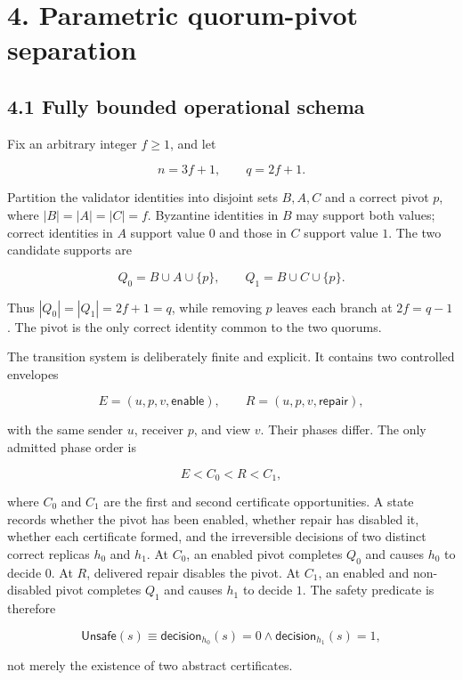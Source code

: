 \documentclass[10pt,a4paper]{article}
\begin{document}
\section{4. Parametric quorum-pivot
separation}\label{parametric-quorum-pivot-separation}

\subsection{4.1 Fully bounded operational
schema}\label{fully-bounded-operational-schema}

Fix an arbitrary integer \(f\geq1\), and let

\[
n=3f+1,\qquad q=2f+1.
\]

Partition the validator identities into disjoint sets \(B,A,C\) and a
correct pivot \(p\), where \(|B|=|A|=|C|=f\). Byzantine identities in
\(B\) may support both values; correct identities in \(A\) support value
\(0\) and those in \(C\) support value \(1\). The two candidate supports
are

\[
Q_0=B\cup A\cup\{p\},\qquad Q_1=B\cup C\cup\{p\}.
\]

Thus \(|Q_0|=|Q_1|=2f+1=q\), while removing \(p\) leaves each branch at
\(2f=q-1\). The pivot is the only correct identity common to the two
quorums.

The transition system is deliberately finite and explicit. It contains
two controlled envelopes

\[
E=(u,p,v,\mathsf{enable}),\qquad R=(u,p,v,\mathsf{repair}),
\]

with the same sender \(u\), receiver \(p\), and view \(v\). Their phases
differ. The only admitted phase order is

\[
E<C_0<R<C_1,
\]

where \(C_0\) and \(C_1\) are the first and second certificate
opportunities. A state records whether the pivot has been enabled,
whether repair has disabled it, whether each certificate formed, and the
irreversible decisions of two distinct correct replicas \(h_0\) and
\(h_1\). At \(C_0\), an enabled pivot completes \(Q_0\) and causes
\(h_0\) to decide \(0\). At \(R\), delivered repair disables the pivot.
At \(C_1\), an enabled and non-disabled pivot completes \(Q_1\) and
causes \(h_1\) to decide \(1\). The safety predicate is therefore

\[
\mathsf{Unsafe}(s)\equiv
\mathsf{decision}_{h_0}(s)=0\land
\mathsf{decision}_{h_1}(s)=1,
\]

not merely the existence of two abstract certificates.
\end{document}
